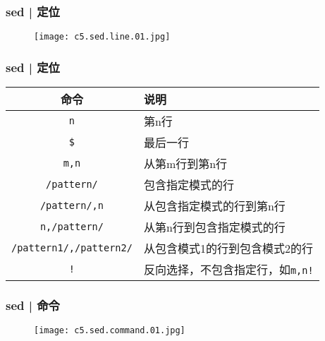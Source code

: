 \begin{frame}
  \frametitle{sed | 定位}
  \begin{figure}
    \centering
    \texttt{[image: c5.sed.line.01.jpg]}
  \end{figure}
\end{frame}

\begin{frame}[fragile]
  \frametitle{sed | \alert{定位}}
  \begin{table}
    \centering
    \begin{tabularx}{\textwidth}{cX}
      \hline
      \rowcolor{blue!50}命令 & 说明\\
      \hline
      \verb|n| & 第n行\\
      \verb|$| & 最后一行\\
      \verb|m,n| & 从第m行到第n行\\
      \verb|/pattern/| & 包含指定模式的行\\
      \verb|/pattern/,n| & 从包含指定模式的行到第n行\\
      \verb|n,/pattern/| & 从第n行到包含指定模式的行\\
      \verb|/pattern1/,/pattern2/| & 从包含模式1的行到包含模式2的行\\
      \verb|!| & 反向选择，不包含指定行，如\verb|m,n!|\\
      \hline
    \end{tabularx}
  \end{table}
\end{frame}

\begin{frame}
  \frametitle{sed | 命令}
  \begin{figure}
    \centering
    \texttt{[image: c5.sed.command.01.jpg]}
  \end{figure}
\end{frame}

